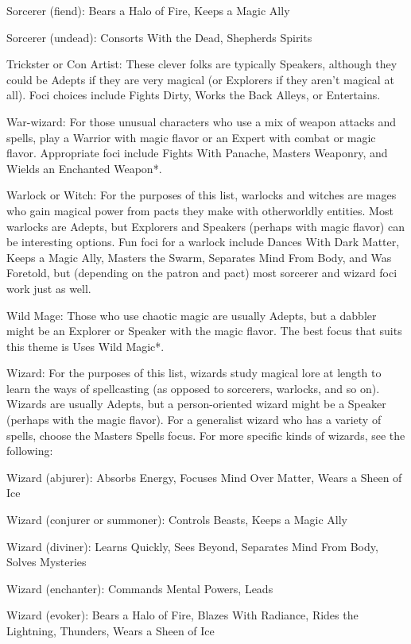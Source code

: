 Sorcerer (fiend): Bears a Halo of Fire, Keeps a Magic Ally 

Sorcerer (undead): Consorts With the Dead, Shepherds Spirits

Trickster or Con Artist: These clever folks are typically Speakers, although they could be Adepts if they are very magical (or Explorers if they aren’t magical at all). Foci choices include Fights Dirty, Works the Back Alleys, or Entertains. 

War-wizard: For those unusual characters who use a mix of weapon attacks and spells, play a Warrior with magic flavor or an Expert with combat or magic flavor. Appropriate foci include Fights With Panache, Masters Weaponry, and Wields an Enchanted Weapon*. 

Warlock or Witch: For the purposes of this list, warlocks and witches are mages who gain magical power from pacts they make with otherworldly entities. Most warlocks are Adepts, but Explorers and Speakers (perhaps with magic flavor) can be interesting options. Fun foci for a warlock include Dances With Dark Matter, Keeps a Magic Ally, Masters the Swarm, Separates Mind From Body, and Was Foretold, but (depending on the patron and pact) most sorcerer and wizard foci work just as well. 

Wild Mage: Those who use chaotic magic are usually Adepts, but a dabbler might be an Explorer or Speaker with the magic flavor. The best focus that suits this theme is Uses Wild Magic*.

Wizard: For the purposes of this list, wizards study magical lore at length to learn the ways of spellcasting (as opposed to sorcerers, warlocks, and so on). Wizards are usually Adepts, but a person-oriented wizard might be a Speaker (perhaps with the magic flavor). For a generalist wizard who has a variety of spells, choose the Masters Spells focus. For more specific kinds of wizards, see the following: 

Wizard (abjurer): Absorbs Energy, Focuses Mind Over Matter, Wears a Sheen of Ice 

Wizard (conjurer or summoner): Controls Beasts, Keeps a Magic Ally 

Wizard (diviner): Learns Quickly, Sees Beyond, Separates Mind From Body, Solves Mysteries 

Wizard (enchanter): Commands Mental Powers, Leads 

Wizard (evoker): Bears a Halo of Fire, Blazes With Radiance, Rides the Lightning, Thunders, Wears a Sheen of Ice 

